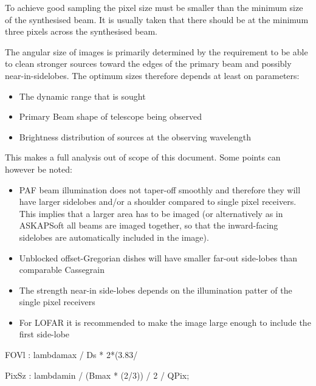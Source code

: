 \documentclass[useAMS,usenatbib,referee]{article}
\begin{document}
To achieve good sampling the pixel size must be smaller than the
minimum size of the synthesised beam. It is usually taken that there
should be at the minimum three pixels across the synthesised beam. 

The angular size of images is primarily determined by the requirement
to be able to clean stronger sources toward the edges of the primary
beam and possibly near-in-sidelobes. The optimum sizes therefore
depends at least on parameters:
\begin{itemize}
  \item The dynamic range that is sought
  \item Primary Beam shape of telescope being observed
  \item Brightness distribution of sources at the observing wavelength
\end{itemize}
This makes a full analysis out of scope of this document. Some points
can however be noted:
\begin{itemize}
\item PAF beam illumination does not taper-off smoothly and therefore
  they will have larger sidelobes and/or a shoulder compared to single
  pixel receivers. This implies that a larger area has to be imaged
  (or alternatively as in ASKAPSoft all beams are imaged together, so
  that the inward-facing sidelobes are automatically included in the
  image).
\item Unblocked offset-Gregorian dishes will have smaller far-out
  side-lobes than comparable Cassegrain 
\item The strength near-in side-lobes depends on the illumination
  patter of the single pixel receivers
\item For LOFAR it is recommended to make the image large enough to
  include the first side-lobe
\end{itemize}

\begin{maxima}[]
FOVl : lambdamax / Ds * 2*(3.83/ %
\maximaoutput*
{} \\
\end{maxima}

\begin{maxima}[]
PixSz : lambdamin / (Bmax * (2/3)) / 2 / QPix;
\maximaoutput*
{} \\
\end{maxima}
\end{document}
